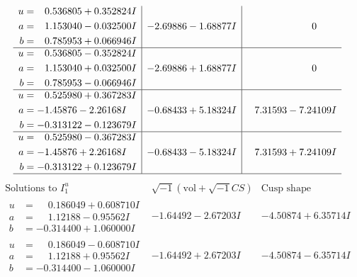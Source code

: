 \documentclass[1p]{elsarticle_modified}
\theoremstyle{definition}
\newcommand{\I}{\sqrt{-1}}
\begin{document}
$$\begin{array}{c|c|c}
\begin{aligned}
u &= \phantom{-}0.536805 + 0.352824 I \\
a &= \phantom{-}1.153040 - 0.032500 I \\
b &= \phantom{-}0.785953 + 0.066946 I\end{aligned}
 & -2.69886 - 1.68877 I & \phantom{-0.000000 } 0 \\ \hline\begin{aligned}
u &= \phantom{-}0.536805 - 0.352824 I \\
a &= \phantom{-}1.153040 + 0.032500 I \\
b &= \phantom{-}0.785953 - 0.066946 I\end{aligned}
 & -2.69886 + 1.68877 I & \phantom{-0.000000 } 0 \\ \hline\begin{aligned}
u &= \phantom{-}0.525980 + 0.367283 I \\
a &= -1.45876 - 2.26168 I \\
b &= -0.313122 - 0.123679 I\end{aligned}
 & -0.68433 + 5.18324 I & \phantom{-}7.31593 - 7.24109 I \\ \hline\begin{aligned}
u &= \phantom{-}0.525980 - 0.367283 I \\
a &= -1.45876 + 2.26168 I \\
b &= -0.313122 + 0.123679 I\end{aligned}
 & -0.68433 - 5.18324 I & \phantom{-}7.31593 + 7.24109 I\\
 \hline 
 \end{array}$$\newpage$$\begin{array}{c|c|c}  
\text{Solutions to }I^u_{1}& \I (\text{vol} + \sqrt{-1}CS) & \text{Cusp shape}\\
 \hline 
\begin{aligned}
u &= \phantom{-}0.186049 + 0.608710 I \\
a &= \phantom{-}1.12188 - 0.95562 I \\
b &= -0.314400 + 1.060000 I\end{aligned}
 & -1.64492 - 2.67203 I & -4.50874 + 6.35714 I \\ \hline\begin{aligned}
u &= \phantom{-}0.186049 - 0.608710 I \\
a &= \phantom{-}1.12188 + 0.95562 I \\
b &= -0.314400 - 1.060000 I\end{aligned}
 & -1.64492 + 2.67203 I & -4.50874 - 6.35714 I \\ \hline\begin{aligned}

\end{aligned}
\end{array}$$
\end{document}

